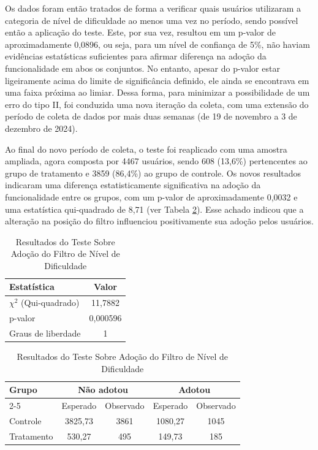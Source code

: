 Os dados foram então tratados de forma a verificar quais usuários utilizaram a categoria de nível de dificuldade ao menos uma vez no período, sendo possível então a aplicação do teste. Este, por sua vez, resultou em um p-valor de aproximadamente 0,0896, ou seja, para um nível de confiança de 5\%, não haviam evidências estatísticas suficientes para afirmar diferença na adoção da funcionalidade em abos os conjuntos. No entanto, apesar do p-valor estar ligeiramente acima do limite de significância definido, ele ainda se encontrava em uma faixa próxima ao limiar. Dessa forma, para minimizar a possibilidade de um erro do tipo II, foi conduzida uma nova iteração da coleta, com uma extensão do período de coleta de dados por mais duas semanas (de 19 de novembro a 3 de dezembro de 2024).

Ao final do novo período de coleta, o teste foi reaplicado com uma amostra ampliada, agora composta por 4467 usuários, sendo 608 (13,6\%) pertencentes ao grupo de tratamento e 3859 (86,4\%) ao grupo de controle. Os novos resultados indicaram uma diferença estatisticamente significativa na adoção da funcionalidade entre os grupos, com um p-valor de aproximadamente 0,0032 e uma estatística qui-quadrado de 8,71 (ver Tabela \ref{tab:exp-adocao-dificuldade}). Esse achado indicou que a alteração na posição do filtro influenciou positivamente sua adoção pelos usuários.

\begin{table}[h]
    \centering
    \caption{Resultados do Teste Sobre Adoção do Filtro de Nível de Dificuldade}
    \label{tab:exp-adocao-dificuldade}

    \begin{tabular}{lc}
        \hline
        \textbf{Estatística} & \textbf{Valor} \\ \hline
        $\chi^2$ (Qui-quadrado) & 11,7882 \\
        p-valor & 0,000596 \\  
        Graus de liberdade & 1 \\ \hline
    \end{tabular}

    \vspace{0.5cm} %

    \begin{tabular}{lcccc}
        \hline
        \multirow{2}{*}{\textbf{Grupo}} & \multicolumn{2}{c}{\textbf{Não adotou}} & \multicolumn{2}{c}{\textbf{Adotou}} \\ 
        \cline{2-5}
        & Esperado & Observado & Esperado & Observado \\ \hline
        Controle & 3825,73 & 3861 & 1080,27 & 1045 \\
        Tratamento & 530,27 & 495 & 149,73 & 185 \\ \hline
    \end{tabular}

    \begin{center}
    \end{center}

\end{table}

